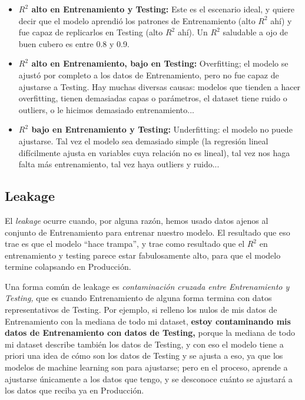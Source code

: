 \documentclass[spanish,oneside]{book} %
\begin{document}
\begin{itemize}
   \item \textbf{$R^2$ alto en Entrenamiento y Testing:} Este es el escenario ideal, y quiere decir que el modelo aprendió los patrones de Entrenamiento (alto $R^2$ ahí) y fue capaz de replicarlos en Testing (alto $R^2$ ahí). Un $R^2$ saludable a ojo de buen cubero es entre 0.8 y 0.9.
   \item \textbf{$R^2$ alto en Entrenamiento, bajo en Testing:} Overfitting; el modelo se ajustó por completo a los datos de Entrenamiento, pero no fue capaz de ajustarse a Testing. Hay muchas diversas causas: modelos que tienden a hacer overfitting, tienen demasiadas capas o parámetros, el dataset tiene ruido o outliers, o le hicimos demasiado entrenamiento...
   \item \textbf{$R^2$ bajo en Entrenamiento y Testing:} Underfitting: el modelo no puede ajustarse. Tal vez el modelo sea demasiado simple (la regresión lineal difícilmente ajusta en variables cuya relación no es lineal), tal vez nos haga falta más entrenamiento, tal vez haya outliers y ruido...
\end{itemize}


\subsection{Leakage}

El \textit{leakage} ocurre cuando, por alguna razón, hemos usado datos ajenos al conjunto de Entrenamiento para entrenar nuestro modelo. El resultado que eso trae es que el modelo ``hace trampa'', y trae como resultado que el $R^2$ en entrenamiento y testing parece estar fabulosamente alto, para que el modelo termine colapsando en Producción.

Una forma común de leakage es \textit{contaminación cruzada entre Entrenamiento y Testing,} que es cuando Entrenamiento de alguna forma termina con datos representativos de Testing. Por ejemplo, si relleno los nulos de mis datos de Entrenamiento con la mediana de todo mi dataset, \textbf{estoy contaminando mis datos de Entrenamiento con datos de Testing,} porque la mediana de todo mi dataset describe también los datos de Testing, y con eso el modelo tiene a priori una idea de cómo son los datos de Testing y se ajusta a eso, ya que los modelos de machine learning son para ajustarse; pero en el proceso, aprende a ajustarse únicamente a los datos que tengo, y se desconoce cuánto se ajustará a los datos que reciba ya en Producción.
\end{document}
